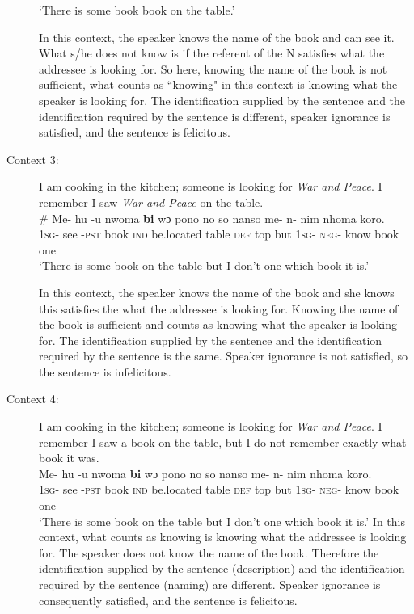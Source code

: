 \documentclass[output=paper,modfonts,nonflat,draftmode]{langsci/langscibook}
\begin{document}
\begin{description}
\glt `There is some book book on the table.'

 \z In this context, the speaker knows the name of the book and can see it. What s/he does not know is if the referent of the N satisfies what the addressee is looking for. So here, knowing the name of the book is not sufficient, what counts as ``knowing" in this context is knowing what the speaker is looking for.  The identification supplied by the sentence and the identification required by the sentence is different, speaker ignorance is satisfied, and the sentence is felicitous.
 
\item[Context 3:] I am cooking in the kitchen; someone is looking for \emph{War and Peace}. I remember I saw \emph{War and Peace} on the table.
\ea\label{owusu:ex62a}\\
\gll \# Me- hu -u nwoma \textbf{bi} wɔ pono no so nanso me- n- nim nhoma koro.\\
	     {} \textsc{1sg}- see -\textsc{pst}  book \textsc{ind}  be.located table \textsc{def}  top but \textsc{1sg}- \textsc{neg}- know book one\\
\glt `There is some book on the table but I don't one which book it is.'

 \z In this context, the speaker knows the name of the book and she knows this satisfies the what the addressee is looking for. Knowing the name of the book is sufficient and counts as knowing what the speaker is looking for. The identification supplied by the sentence and the identification required by the sentence is the same. Speaker ignorance is not satisfied, so the sentence is infelicitous.
\item[Context 4:] I am cooking in the kitchen; someone is looking for \emph{War and Peace}. I remember I saw a book on the table, but I do not remember exactly what book it was.
\ea\label{owusu:ex62b}\\
\gll Me- hu -u nwoma \textbf{bi} wɔ pono no so nanso me- n- nim nhoma koro.\\
	     \textsc{1sg}- see -\textsc{pst}  book \textsc{ind}  be.located table \textsc{def} top but \textsc{1sg}- \textsc{neg}- know book one\\

\glt `There is some book on the table but I don't one which book it is.'
\z In this context, what counts as knowing is knowing what the addressee is looking for. The speaker does not know the name of the book. Therefore the identification supplied by the sentence (description) and the identification required by the sentence (naming) are different. Speaker ignorance is consequently satisfied, and the sentence is felicitous. 
\end{description}
\end{document}
